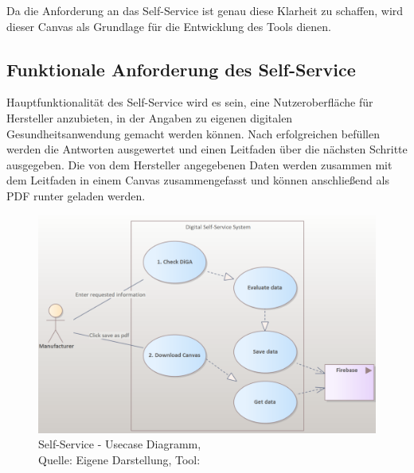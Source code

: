 Da die Anforderung an das Self-Service ist genau diese Klarheit zu schaffen, wird dieser Canvas als Grundlage für die Entwicklung des Tools dienen.

\subsection{Funktionale Anforderung des Self-Service}
Hauptfunktionalität des Self-Service wird es sein, eine Nutzeroberfläche für Hersteller anzubieten, in der Angaben zu eigenen digitalen Gesundheitsanwendung gemacht werden können.
Nach erfolgreichen befüllen werden die Antworten ausgewertet und einen Leitfaden über die nächsten Schritte ausgegeben. Die von dem Hersteller angegebenen Daten werden zusammen mit dem Leitfaden in einem Canvas zusammengefasst und können anschließend als PDF runter geladen werden.
\begin{figure}[H]
	\centering
	\includegraphics[width=450px, keepaspectratio]{assets/usecase1.png}
	\caption[Self-Service - Usecase Diagramm]{Self-Service - Usecase Diagramm,\\Quelle: Eigene Darstellung, Tool: \cite{enterpriseArchitect}}
\end{figure}
